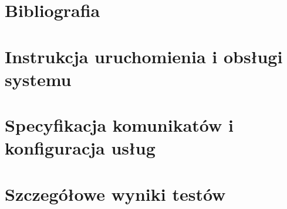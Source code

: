 \documentclass[11pt,a4paper]{report}
\begin{document}
\chapter*{Bibliografia}
{}

\appendix
\chapter{Instrukcja uruchomienia i obsługi systemu}
\chapter{Specyfikacja komunikatów i konfiguracja usług}
\chapter{Szczegółowe wyniki testów}
\end{document}
